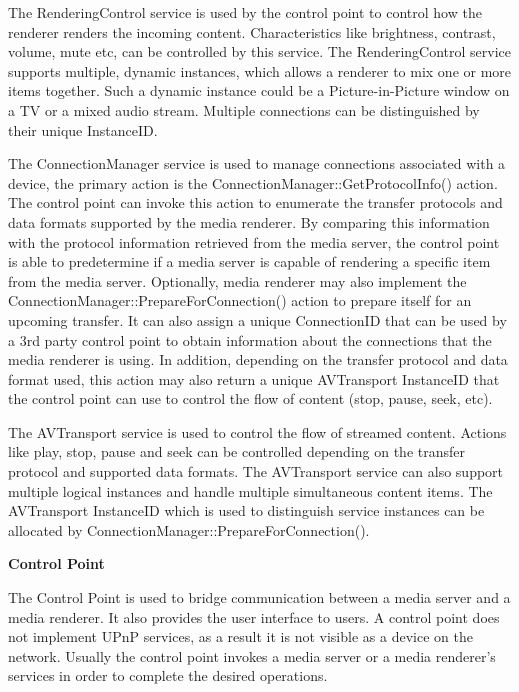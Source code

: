 The RenderingControl service is used by the control point to control how the renderer 
renders the incoming content. Characteristics like brightness, contrast, 
volume, mute etc, can be controlled by this service. The RenderingControl service 
supports multiple, dynamic instances, which allows a renderer to mix one or 
more items together. Such a dynamic instance could be a Picture-in-Picture
window on a TV or a mixed audio stream. Multiple connections can be
distinguished by their unique InstanceID. 

The ConnectionManager service is used to manage connections associated with a 
device, the primary action is the ConnectionManager::GetProtocolInfo() action. 
The control point can invoke this action to enumerate the transfer protocols and 
data formats supported by the media renderer. By comparing this information with 
the protocol information retrieved from the media server, the control point is able to 
predetermine if a media server is capable of rendering a specific item from 
the media server. Optionally, media renderer may also implement the
ConnectionManager::PrepareForConnection() action to prepare itself for an 
upcoming transfer. It can also assign a unique ConnectionID that can be used by 
a 3rd party control point to obtain information about the connections that the media 
renderer is using. In addition, depending on the transfer protocol and data 
format used, this action may also return a unique AVTransport InstanceID that the control 
point can use to control the flow of content (stop, pause, seek, etc). 

The AVTransport service is used to control the flow of streamed content. Actions 
like play, stop, pause and seek can be controlled depending on the transfer 
protocol and supported data formats. The AVTransport service can also support 
multiple logical instances and handle multiple simultaneous content items. The 
AVTransport InstanceID which is used to distinguish service instances can be 
allocated by ConnectionManager::PrepareForConnection(). 

\textbf{Control Point} 

The Control Point is used to bridge communication between a media server and a media renderer. 
It also provides the user interface to users. A control point does not implement UPnP 
services, as a result it is not visible as a device on the network. Usually the control point 
invokes a media server or a media renderer's services in order to complete the 
desired operations.

